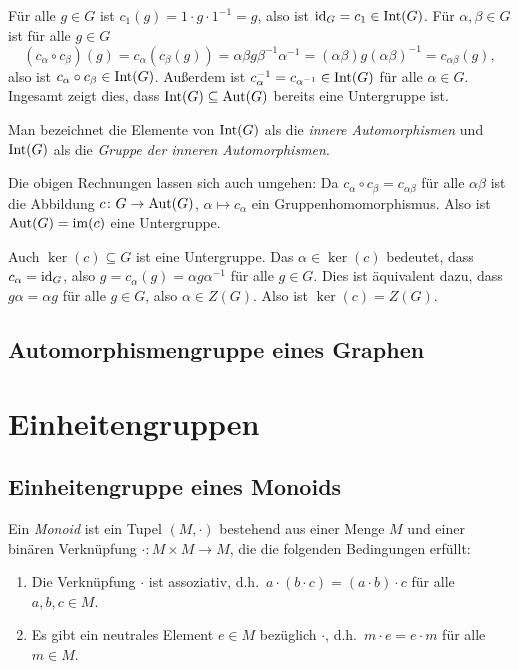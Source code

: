 Für alle $g \in G$ ist $c_1(g) = 1 \cdot g \cdot 1^{-1} = g$, also ist $\mathrm{id}_G = c_1 \in \mathrm{Int}(G)$. Für $\alpha, \beta \in G$ ist für alle $g \in G$
\[
 (c_\alpha \circ c_\beta)(g)
 = c_\alpha( c_\beta(g) )
 = \alpha \beta g \beta^{-1} \alpha^{-1}
 = (\alpha \beta) g (\alpha \beta)^{-1}
 = c_{\alpha \beta}(g),
\]
also ist $c_\alpha \circ c_\beta \in \mathrm{Int}(G)$. Außerdem ist $c_\alpha^{-1} = c_{\alpha^{-1}} \in \mathrm{Int}(G)$ für alle $\alpha \in G$. Ingesamt zeigt dies, dass $\mathrm{Int}(G) \subseteq \mathrm{Aut}(G)$ bereits eine Untergruppe ist.

Man bezeichnet die Elemente von $\mathrm{Int}(G)$ als die \emph{innere Automorphismen} und $\mathrm{Int}(G)$ als die \emph{Gruppe der inneren Automorphismen}.

\begin{bem}
 Die obigen Rechnungen lassen sich auch umgehen: Da $c_\alpha \circ c_\beta = c_{\alpha \beta}$ für alle $\alpha \beta$ ist die Abbildung $c \colon G \to \mathrm{Aut}(G)$, $\alpha \mapsto c_\alpha$ ein Gruppenhomomorphismus. Also ist $\mathrm{Aut}(G) = \mathrm{im}(c)$ eine Untergruppe.
 
 Auch $\ker(c) \subseteq G$ ist eine Untergruppe. Das $\alpha \in \ker(c)$ bedeutet, dass $c_\alpha = \mathrm{id}_G$, also $g = c_\alpha(g) = \alpha g \alpha^{-1}$ für alle $g \in G$. Dies ist äquivalent dazu, dass $g \alpha = \alpha g$ für alle $g \in G$, also $\alpha \in Z(G)$. Also ist $\ker(c) = Z(G)$.
\end{bem}



\subsection{Automorphismengruppe eines Graphen}





\section{Einheitengruppen}


\subsection{Einheitengruppe eines Monoids}
\begin{defi}
 Ein \emph{Monoid} ist ein Tupel $(M, \cdot)$ bestehend aus einer Menge $M$ und einer binären Verknüpfung $\cdot \colon M \times M \to M$, die die folgenden Bedingungen erfüllt:
 \begin{enumerate}[label=\roman*)]
  \item
   Die Verknüpfung $\cdot$ ist assoziativ, d.h.\ $a \cdot (b \cdot c) = (a \cdot b) \cdot c$ für alle $a,b,c \in M$.
  \item
   Es gibt ein neutrales Element $e \in M$ bezüglich $\cdot$, d.h.\ $m \cdot e = e \cdot m$ für alle $m \in M$.
 \end{enumerate}
\end{defi}

